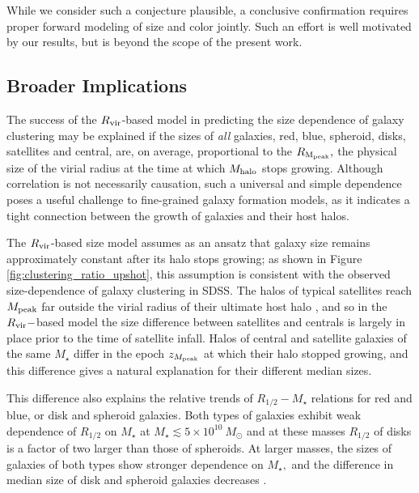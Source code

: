 \documentclass[usenatbib,usegraphicx,letterpaper]{mn2e}
\newcommand{\rhalf}{R_{1/2}}
\newcommand{\mstar}{M_{\star}}
\newcommand{\mpeak}{M_{\rm peak}}
\newcommand{\zpeak}{z_{M_{\rm peak}}}
\newcommand{\mhalo}{M_{\rm halo}}
\newcommand{\rvir}{R_{\rm vir}}
\newcommand{\rmpeak}{R_{\rm M_{peak}}}
\begin{document}
While we consider such a conjecture plausible, a conclusive confirmation requires proper forward modeling of size and color jointly. Such an effort is well motivated by our results, but is beyond the scope of the present work.

\subsection{Broader Implications}
\label{subsec:broader_implications}

The success of the $\rvir$-based model in predicting the size dependence of galaxy clustering may be explained if the sizes of {\it all} galaxies, red, blue, spheroid, disks, satellites and central, are, on average, proportional to the $\rmpeak,$ the physical size of the virial radius at the time at which $\mhalo$ stops growing. Although correlation is not necessarily causation, such a universal and simple dependence poses a useful challenge to fine-grained galaxy formation models, as it indicates a tight connection between the growth of galaxies and their host halos.

The $\rvir$-based size model assumes as an ansatz that galaxy size remains approximately constant after its halo stops growing; as shown in Figure \ref{fig:clustering_ratio_upshot}, this assumption is consistent with the observed size-dependence of galaxy clustering in SDSS.  The halos of typical satellites reach $\mpeak$ far outside the virial radius of their ultimate host halo \citep{behroozi_etal14}, and so in the $\rvir-$based model the size difference between satellites and centrals is largely in place prior to the time of satellite infall. Halos of central and satellite galaxies of the same $\mstar$ differ in the epoch $\zpeak$ at which their halo stopped growing, and this difference gives a natural explanation for their different median sizes.

This difference also explains the relative trends of $\rhalf-\mstar$ relations for red and blue, or disk and spheroid galaxies.
Both types of galaxies exhibit weak dependence of $\rhalf$ on $\mstar$ at $\mstar\lesssim 5\times 10^{10}\ M_\odot$ and
at these masses $\rhalf$ of disks is a factor of two larger than those of spheroids. At larger masses, the sizes of galaxies of both types show stronger dependence on $\mstar,$ and the difference in median size of disk and spheroid galaxies decreases \citep[e.g.,][]{bernardi_etal14}.
\end{document}

